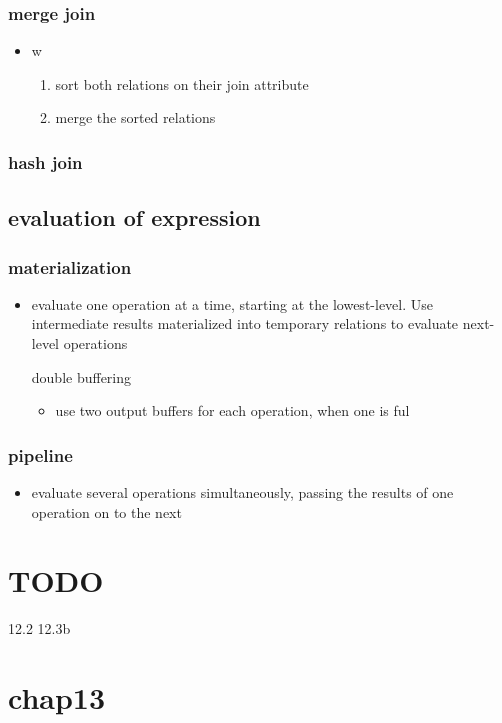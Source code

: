\documentclass[11pt]{article}
\begin{document}
\subsubsection{merge join}
\label{sec-18-4-4}
\begin{itemize}
\item w
\begin{enumerate}
\item sort both relations on their join attribute
\item merge the sorted relations
\end{enumerate}
\end{itemize}
\subsubsection{hash join}
\label{sec-18-4-5}
\subsection{evaluation of expression}
\label{sec-18-5}
\subsubsection{materialization}
\label{sec-18-5-1}
\begin{itemize}
\item evaluate one operation at a time, starting at the lowest-level. Use intermediate
results materialized into temporary relations to evaluate next-level operations
\item[{double buffering}] \begin{itemize}
\item use two output buffers for each operation, when one is ful
\end{itemize}
\end{itemize}
\subsubsection{pipeline}
\label{sec-18-5-2}
\begin{itemize}
\item evaluate several operations simultaneously, passing the results of one operation
on to the next
\end{itemize}
\section{{\bfseries\sffamily TODO} }
\label{sec-19}
12.2 12.3b
\section{chap13}
\label{sec-20}
\end{document}
